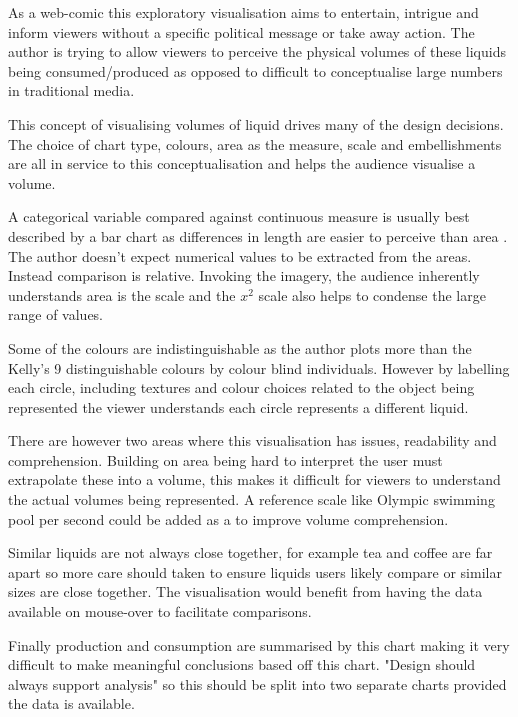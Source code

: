 \documentclass[a4paper,10pt, twocolumn]{article}
\begin{document}
As a web-comic this exploratory visualisation aims to entertain, intrigue and inform viewers without a specific political message or take away action. The author is trying to allow viewers to perceive the physical volumes of these liquids being consumed/produced as opposed to difficult to conceptualise large numbers in traditional media.  

This concept of visualising volumes of liquid drives many of the design decisions. The choice of chart type, colours, area as the measure, scale and embellishments are all in service to this conceptualisation and helps the audience visualise a volume.  

A categorical variable compared against continuous measure is usually best described by a bar chart\cite{showme} as differences in length are easier to perceive than area \cite{perception}. The author doesn't expect numerical values to be extracted from the areas. Instead comparison is relative. Invoking the imagery, the audience inherently understands area is the scale and the $x^2$ scale also helps to condense the large range of values.  

Some of the colours are indistinguishable as the author plots more than the Kelly's 9 distinguishable colours by colour blind individuals\cite{twentytwo}. However by labelling each circle, including textures and colour choices related to the object being represented the viewer understands each circle represents a different liquid. 

There are however two areas where this visualisation has issues, readability and comprehension. Building on area being hard to interpret the user must extrapolate these into a volume, this makes it difficult for viewers to understand the actual volumes being represented. A reference scale like Olympic swimming pool per second could be added as a to improve volume comprehension.

Similar liquids are not always close together, for example tea and coffee are far apart so more care should taken to ensure liquids users likely compare or similar sizes are close together. The visualisation would benefit from having the data available on mouse-over to facilitate comparisons.   

Finally production and consumption are summarised by this chart making it very difficult to make meaningful conclusions based off this chart. "Design should always support analysis"\cite{tufte} so this should be split into two separate charts provided the data is available. 
\end{document}
